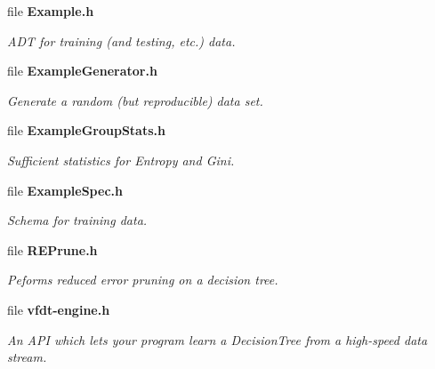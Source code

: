 \begin{CompactItemize}
\item 
file {\bf Example.h}
\begin{CompactList}\small\item\em ADT for training (and testing, etc.) data. \item\end{CompactList}

\item 
file {\bf Example\-Generator.h}
\begin{CompactList}\small\item\em Generate a random (but reproducible) data set. \item\end{CompactList}

\item 
file {\bf Example\-Group\-Stats.h}
\begin{CompactList}\small\item\em Sufficient statistics for Entropy and Gini. \item\end{CompactList}

\item 
file {\bf Example\-Spec.h}
\begin{CompactList}\small\item\em Schema for training data. \item\end{CompactList}

\item 
file {\bf REPrune.h}
\begin{CompactList}\small\item\em Peforms reduced error pruning on a decision tree. \item\end{CompactList}

\item 
file {\bf vfdt-engine.h}
\begin{CompactList}\small\item\em An API which lets your program learn a Decision\-Tree from a high-speed data stream. \item\end{CompactList}

\end{CompactItemize}
